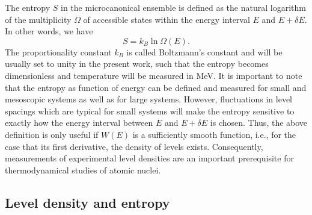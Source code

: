 \documentclass[sort&compress,final,numberedheadings]{aipproc}
\begin{document}
The entropy $S$ in the microcanonical ensemble is defined as the natural 
logarithm of the multiplicity $\Omega$ of accessible states within the energy 
interval $E$ and $E+\delta E$. In other words, we have 
\begin{equation}
S=k_B\ln\Omega(E).
\end{equation}
The proportionality constant $k_B$ is called Boltzmann's constant and will be 
usually set to unity in the present work, such that the entropy becomes 
dimensionless and temperature will be measured in MeV\@. It is important to 
note that the entropy as function of energy can be defined and measured for 
small and mesoscopic systems as well as for large systems. However, 
fluctuations in level spacings which are typical for small systems will make 
the entropy sensitive to exactly how the energy interval between $E$ and 
$E+\delta E$ is chosen. Thus, the above definition is only useful if $W(E)$ is
a sufficiently smooth function, i.e., for the case that its first derivative, 
the density of levels exists. Consequently, measurements of experimental level 
densities are an important prerequisite for thermodynamical studies of atomic 
nuclei. 

\subsection{Level density and entropy}
\label{sect:spindist}
\end{document}
